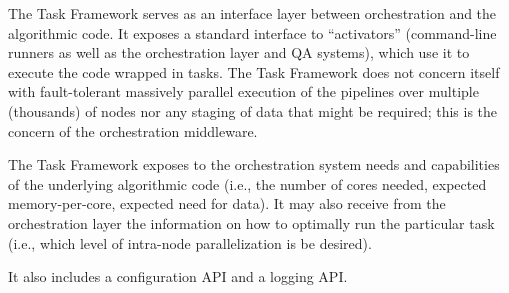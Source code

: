 \documentclass[DM,toc]{lsstdoc}
\begin{document}
The Task Framework serves as an interface layer between orchestration
and the algorithmic code. It exposes a standard interface to
``activators'' (command-line runners as well as the orchestration layer
and QA systems), which use it to execute the code wrapped in tasks. The
Task Framework does not concern itself with fault-tolerant massively
parallel execution of the pipelines over multiple (thousands) of nodes
nor any staging of data that might be required; this is the concern of
the orchestration middleware.

The Task Framework exposes to the orchestration system needs and
capabilities of the underlying algorithmic code (i.e., the number of
cores needed, expected memory-per-core, expected need for data). It may
also receive from the orchestration layer the information on how to
optimally run the particular task (i.e., which level of intra-node
parallelization is be desired).

It also includes a configuration API and a logging API.





\end{document}
